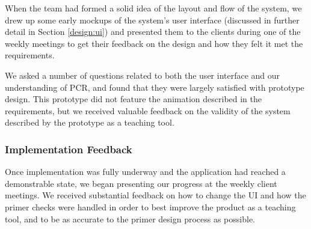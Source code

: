 When the team had formed a solid idea of the layout and flow of the
system, we drew up some early mockups of the system's user interface
(discussed in further detail in Section \ref{design:ui}) and presented
them to the clients during 
one of the weekly meetings %
to get their feedback on the design and how they felt it met the 
requirements. 

We asked a number of questions related to both the user
interface and our understanding of PCR, and found that they were largely
satisfied with prototype design. This prototype did not feature the
animation described in the requirements, but we received valuable feedback
on the validity of the system described by the prototype as a teaching
tool.


\subsubsection{Implementation Feedback}
Once implementation was fully underway and the application had reached
a demonstrable state, we began presenting our progress at the weekly client
meetings. We received substantial feedback on how to change the UI and 
how the primer checks were handled in order
to best improve the product as a teaching tool, and to be as accurate to
the primer design process as possible.  
